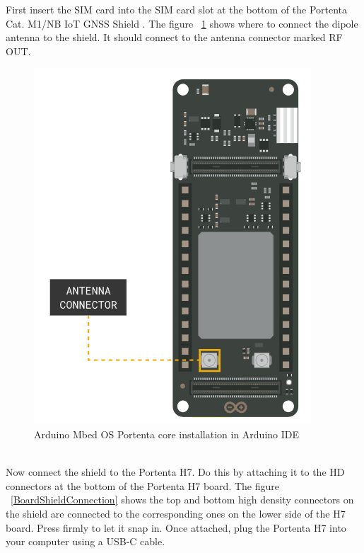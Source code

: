 First insert the SIM card into the SIM card slot at the bottom of the Portenta Cat. M1/NB IoT GNSS Shield \cite{ArduinoPortentaSketch:2024}. The figure ~\ref{DipoleAntenna} shows where to connect the dipole antenna to the shield. It should connect to the antenna connector marked RF OUT.
\begin{figure}
	\begin{center}
		\includegraphics[width=0.7\linewidth]{Images/PotentaIoTGNSSShield/AntennaConnector.png}
		\caption{Arduino Mbed OS Portenta core installation in Arduino IDE}
		\label{DipoleAntenna}
	\end{center}
\end{figure}
\\
Now connect the shield to the Portenta H7. Do this by attaching it to the HD connectors at the bottom of the Portenta H7 board. The figure ~\ref{BoardShieldConnection} shows the top and bottom high density connectors on the shield are connected to the corresponding ones on the lower side of the H7 board. Press firmly to let it snap in. Once attached, plug the Portenta H7 into your computer using a USB-C cable.
